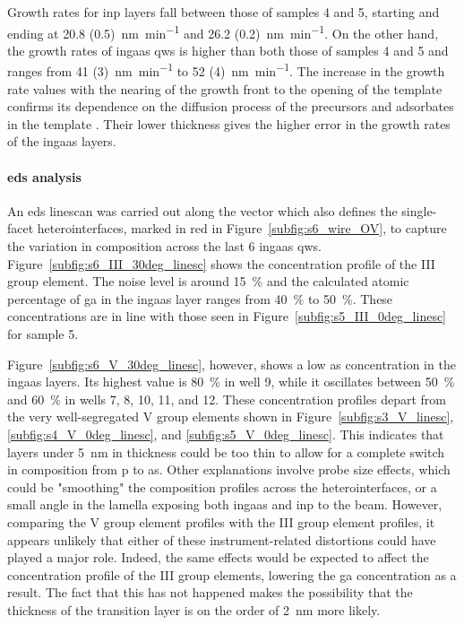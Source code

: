 Growth rates for \acs{inp} layers fall between those of samples 4 and 5, starting and ending at \qty[separate-uncertainty=true]{20.8 (0.5)}{\nano\metre\per\minute} and \qty[separate-uncertainty=true]{26.2 (0.2)}{\nano\metre\per\minute}. On the other hand, the growth rates of \acs{ingaas} \acl{qw}s is higher than both those of samples 4 and 5 and ranges from \qty[separate-uncertainty=true]{41 (3)}{\nano\metre\per\minute} to \qty[separate-uncertainty=true]{52 (4)} {\nano\metre\per\minute}. The increase in the growth rate values with the nearing of the growth front to the opening of the template confirms its dependence on the diffusion process of the precursors and adsorbates in the template \cite{bjork2012}. Their lower thickness gives the higher error in the growth rates of the \acs{ingaas} layers.

\paragraph{\acs{eds} analysis} An \acs{eds} linescan was carried out along the  vector which also defines the  single-facet heterointerfaces, marked in red in Figure~\ref{subfig:s6_wire_OV}, to capture the variation in composition across the last \num{6} \acs{ingaas} \acl{qw}s. Figure~\ref{subfig:s6_III_30deg_linesc} shows the concentration profile of the III group element. The noise level is around \qty{15}{\%} and the calculated atomic percentage of \acl{ga} in the \acs{ingaas} layer ranges from \qty{40}{\%} to \qty{50}{\%}. These concentrations are in line with those seen in Figure~\ref{subfig:s5_III_0deg_linesc} for sample 5.

Figure~\ref{subfig:s6_V_30deg_linesc}, however, shows a low \acl{as} concentration in the \acs{ingaas} layers. Its highest value is \qty{80}{\%} in well \num{9}, while it oscillates between \qty{50}{\%} and \qty{60}{\%} in wells \num{7}, \num{8}, \num{10}, \num{11}, and \num{12}. These concentration profiles depart from the very well-segregated V group elements shown in Figure~\ref{subfig:s3_V_linesc}, \ref{subfig:s4_V_0deg_linesc}, and \ref{subfig:s5_V_0deg_linesc}. This indicates that layers under \qty{5}{\nano\metre} in thickness could be too thin to allow for a complete switch in composition from \acl{p} to \acs{as}. Other explanations involve probe size effects, which could be "smoothing" the composition profiles across the heterointerfaces, or a small angle in the lamella exposing both \acs{ingaas} and \acs{inp} to the beam. However, comparing the V group element profiles with the III group element profiles, it appears unlikely that either of these instrument-related distortions could have played a major role. Indeed, the same effects would be expected to affect the concentration profile of the III group elements, lowering the \acl{ga} concentration as a result. The fact that this has not happened makes the possibility that the thickness of the transition layer is on the order of \qty{2}{\nano\metre} more likely. 

